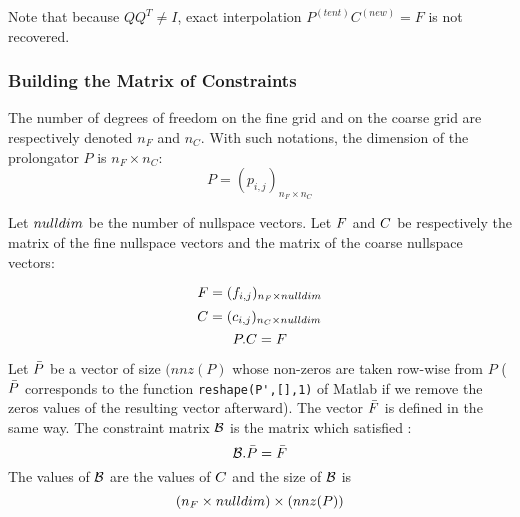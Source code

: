 Note that because $QQ^{T} \neq I$, exact interpolation $P^{(tent)}C^{(new)} = F$ is not recovered.

\subsubsection{Building the Matrix of Constraints}


The number of degrees of freedom on the fine grid and on the coarse
grid are respectively denoted $n_F$ and $n_C$. With such notations,
the dimension of the prolongator $P$ is $n_F \times n_C$:
$$P = (p_{i,j})_{n_F \times n_C}$$

Let $nulldim$ be the number of nullspace vectors.
Let $F$ and $C$ be respectively the matrix of the fine nullspace vectors and the matrix of the coarse nullspace vectors:

$$F = (f_{i,j})_{n_F \times nulldim}$$
$$C = (c_{i,j})_{n_C \times nulldim}$$
$$P.C = F$$

Let $\bar{P}$ be a vector of size $(nnz(P)$ whose non-zeros are taken row-wise from $P$ ($\bar{P}$ corresponds to the function \verb+reshape(P',[],1)+ of Matlab if we remove the zeros values of the resulting vector afterward). The vector $\bar{F}$ is defined in the same way.
The constraint matrix $\mathcal{B}$ is the matrix which satisfied :
$$\mathcal{B} . \bar{P} = \bar{F}$$
The values of $\mathcal{B}$ are the values of $C$ and the size of $\mathcal{B}$ is $$(n_F \times nulldim) \times (nnz(P))$$

